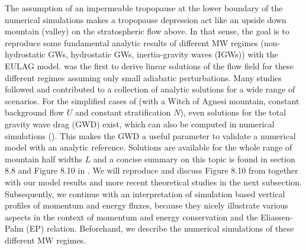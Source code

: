The assumption of an impermeable tropopause at the lower boundary of the numerical simulations makes a tropopause depression act like an upside down mountain (valley) on the stratospheric flow above. In that sense, the goal is to reproduce some fundamental analytic results of different MW regimes (non-hydrostatic GWs, hydrostatic GWs, inertia-gravity waves (IGWs)) with the EULAG model. \textcite{queney_problem_1948} was the first to derive linear solutions of the flow field for these different regimes assuming only small adiabatic perturbations. Many studies followed and contributed to a collection of analytic solutions for a wide range of scenarios. For the simplified cases of \textcite{queney_problem_1948} (with a Witch of Agnesi mountain, constant background flow $U$ and constant stratification $N$), even solutions for the total gravity wave drag (GWD) exist, which can also be computed in numerical simulations (\cite[]{teixeira_physics_2014}). This makes the GWD a useful parameter to validate a numerical model with an analytic reference. Solutions are available for the whole range of mountain half widths $L$ and a concise summary on this topic is found in section 8.8 and Figure 8.10 in \textcite{gill_atmosphere-ocean_1982}. We will reproduce and discuss Figure 8.10 from \textcite[]{gill_atmosphere-ocean_1982} together with our model results and more recent theoretical studies in the next subsection. Subsequently, we continue with an interpretation of simulation based vertical profiles of momentum and energy fluxes, because they nicely illustrate various aspects in the context of momentum and energy conservation and the Eliassen-Palm (EP) relation. Beforehand, we describe the numerical simulations of these different MW regimes.

